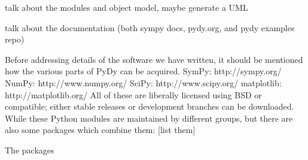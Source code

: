 \documentclass[twocolumn,10pt]{asme2e}
\begin{document}
talk about the modules and object model, maybe generate a UML

talk about the documentation (both sympy docs, pydy.org, and pydy examples repo)

Before addressing details of the software we have written, it should be
mentioned how the various parts of PyDy can be acquired.
SymPy: http://sympy.org/
NumPy: http://www.numpy.org/
SciPy: http://www.scipy.org/
matplotlib: http://matplotlib.org/
All of these are liberally licensed using BSD or compatible; either stable
releases or development branches can be downloaded.
While these Python modules are maintained by different groups, but there are
also some packages which combine them:
[list them]

The packages


\end{document}
